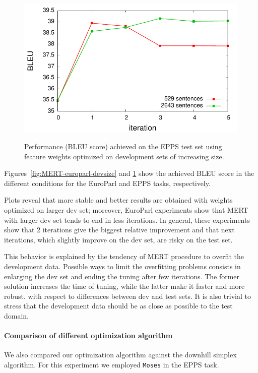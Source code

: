 \documentclass[10pt]{report}
\theoremstyle{plain}
\begin{document}
{\begin{figure}
\begin{center}
\label{fig:MERT-epps-devsize}
 \includegraphics[width=\columnwidth]{epps-cn-devsize}
\caption{Performance (BLEU score) achieved on the EPPS test set using feature weights optimized on  development sets of increasing size.}
\end{center}
 \end{figure}

Figures~\ref{fig:MERT-europarl-devsize} and \ref{fig:MERT-epps-devsize} show the achieved BLEU score in the different conditions for the EuroParl and EPPS tasks, respectively.

Plots reveal that more stable and better results are obtained with weights optimized on larger dev set; moreover, EuroParl experiments show that MERT with larger dev set tends to end in less iterations.
In general, these experiments show that 2 iterations give the biggest relative  improvement and that next iterations, which slightly improve on the dev set, are risky on the test set.

This behavior is explained by the tendency of MERT procedure to overfit the development data. Possible ways to limit the overfitting problems consists in enlarging the dev set  and ending the tuning after few iterations.
The former solution increases the time of tuning, while the latter make it faster and more robust. with respect to differences between dev and test sets. It is also trivial to stress that the development  data should be as close as possible to the test domain.


\paragraph{Comparison of different optimization algorithm} We also compared our optimization algorithm against the downhill simplex algorithm. For this experiment we employed {\tt Moses} in the EPPS task.

}
\end{document}
